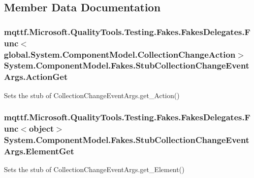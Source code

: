\subsection{Member Data Documentation}
\hypertarget{class_system_1_1_component_model_1_1_fakes_1_1_stub_collection_change_event_args_a82b062f32ed25c3a4bc95ece9f53f28c}{
\subsubsection[{Action\-Get}]{\setlength{\rightskip}{0pt plus 5cm}mqttf.\-Microsoft.\-Quality\-Tools.\-Testing.\-Fakes.\-Fakes\-Delegates.\-Func$<$global.\-System.\-Component\-Model.\-Collection\-Change\-Action$>$ System.\-Component\-Model.\-Fakes.\-Stub\-Collection\-Change\-Event\-Args.\-Action\-Get}}\label{class_system_1_1_component_model_1_1_fakes_1_1_stub_collection_change_event_args_a82b062f32ed25c3a4bc95ece9f53f28c}


Sets the stub of Collection\-Change\-Event\-Args.\-get\-\_\-\-Action()

\hypertarget{class_system_1_1_component_model_1_1_fakes_1_1_stub_collection_change_event_args_a91388658bdb1d36f3c1ac7d155ebbd44}{
\subsubsection[{Element\-Get}]{\setlength{\rightskip}{0pt plus 5cm}mqttf.\-Microsoft.\-Quality\-Tools.\-Testing.\-Fakes.\-Fakes\-Delegates.\-Func$<$object$>$ System.\-Component\-Model.\-Fakes.\-Stub\-Collection\-Change\-Event\-Args.\-Element\-Get}}\label{class_system_1_1_component_model_1_1_fakes_1_1_stub_collection_change_event_args_a91388658bdb1d36f3c1ac7d155ebbd44}


Sets the stub of Collection\-Change\-Event\-Args.\-get\-\_\-\-Element()



